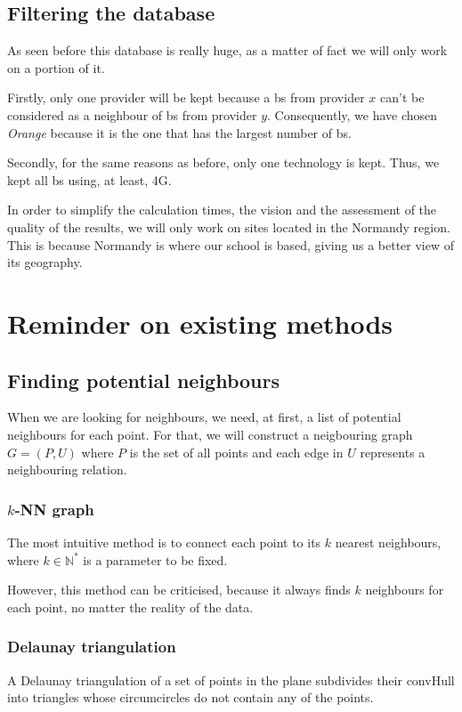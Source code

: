 \documentclass[lettersize,journal,english]{IEEEtran}
\begin{document}
\subsection{Filtering the database}
As seen before this database is really huge, as a matter of fact we will only work on a portion of it.

Firstly, only one provider will be kept because a \acrshort{bs} from provider $x$ can't be considered as a neighbour of \acrshort{bs} from provider $y$.
Consequently, we have chosen \emph{Orange} because it is the one that has the largest number of \acrshort{bs}.

Secondly, for the same reasons as before, only one technology is kept. Thus, we kept all \acrshort{bs} using, at least, 4G.

In order to simplify the calculation times, the vision and the assessment of the quality of the results, we will only work on sites located in the Normandy region.
This is because Normandy is where our school is based, giving us a better view of its geography.

\section{Reminder on existing methods\label{sec:reminder}}
\subsection{Finding potential neighbours}
When we are looking for neighbours, we need, at first, a list of potential neighbours for each point.
For that, we will construct a neigbouring graph $G = (P, U)$ where $P$ is the set of all points and each edge in $U$ represents a neighbouring relation.

\subsubsection{$k$-NN graph}
The most intuitive method is to connect each point to its $k$ nearest neighbours, where $k \in \mathbb{N}^*$ is a parameter to be fixed. 

However, this method can be criticised, because it always finds $k$ neighbours for each point, no matter the reality of the 
data.

\subsubsection{Delaunay triangulation}
A Delaunay triangulation \cite{art_delaunay} of a set of points in the plane subdivides their \gls{convHull} into triangles whose circumcircles 
do not contain any of the points.
\end{document}
